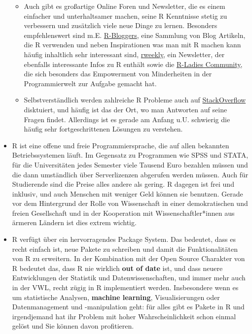 \documentclass[]{book}
\providecommand{\tightlist}{%
  \setlength{\itemsep}{0pt}\setlength{\parskip}{0pt}}
\begin{document}
\begin{itemize}
  \begin{itemize}
  \tightlist
  \item
    Auch gibt es großartige Online Foren und Newsletter, die es einem
    einfacher und unterhaltsamer machen, seine R Kenntnisse stetig zu
    verbessern und zusätzlich viele neue Dinge zu lernen. Besonders
    empfehlenswert sind m.E.
    \href{https://www.r-bloggers.com/}{R-Bloggers}, eine Sammlung von
    Blog Artikeln, die R verwenden und neben Inspirationen was man mit R
    machen kann häufig inhaltlich sehr interessant sind,
    \href{https://rweekly.org/}{rweekly}, ein Newsletter, der ebenfalls
    interessante Infos zu R enthält sowie die
    \href{https://rladies.org/}{R-Ladies Community}, die sich besonders
    das Empowerment von Minderheiten in der Programmierwelt zur Aufgabe
    gemacht hat.
  \item
    Selbstverständlich werden zahlreiche R Probleme auch auf
    \href{https://stackoverflow.com/tags/r/info}{StackOverflow}
    disktuiert, und häufig ist das der Ort, wo man Antworten auf seine
    Fragen findet. Allerdings ist es gerade am Anfang u.U. schwierig die
    häufig sehr fortgeschrittenen Lösungen zu verstehen.
  \end{itemize}
\item
  R ist eine offene und freie Programmiersprache, die auf allen
  bekannten Betriebssystemen läuft. Im Gegensatz zu Programmen wie SPSS
  und STATA, für die Universitäten jedes Semester viele Tausend Euro
  bezahlen müssen und die dann umständlich über Serverlizenzen abgerufen
  werden müssen. Auch für Studierende sind die Preise alles andere als
  gering. R dagegen ist frei und inklusiv, und auch Menschen mit weniger
  Geld können sie benutzen. Gerade vor dem Hintergrund der Rolle von
  Wissenschaft in einer demokratischen und freien Gesellschaft und in
  der Kooperation mit Wissenschaftler*innen aus ärmeren Ländern ist dies
  extrem wichtig.
\item
  R verfügt über ein hervorragendes Package System. Das bedeutet, dass
  es recht einfach ist, neue Pakete zu schreiben und damit die
  Funktionalitäten von R zu erweitern. In der Kombination mit der Open
  Source Charakter von R bedeutet das, dass R nie wirklich \textbf{out
  of date} ist, und dass neuere Entwicklungen der Statistik und
  Datenwissenschaften, und immer mehr auch in der VWL, recht zügig in R
  implementiert werden. Insbesondere wenn es um statistische Analysen,
  \textbf{machine learning}, Visualisierungen oder Datenmanagement und
  -manipulation geht: für alles gibt es Pakete in R und irgendjemand hat
  ihr Problem mit hoher Wahrscheinlichkeit schon einmal gelöst und Sie
  können davon profitieren.


\end{itemize}
\end{document}
